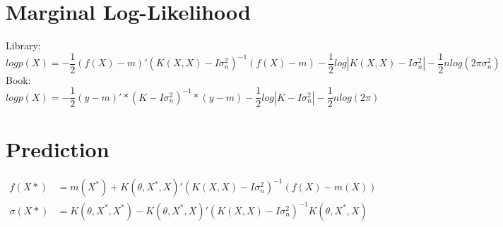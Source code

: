 \documentclass[11pt]{article}
\begin{document}
\title{}
\author{}
\date{}
\maketitle

\section{Marginal Log-Likelihood}
Library:
\begin{equation}
	log p(X) = - \frac{1}{2}(f(X)-m)'(K(X,X)-I\sigma_n^2)^{-1} (f(X)-m) - \frac{1}{2} log|K(X,X)-I\sigma_n^2 | - \frac{1}{2}n log(2 \pi \sigma_n^2)
\end{equation}
Book:
\begin{equation}
	log p(X) = - \frac{1}{2}(y-m)'* (K-I\sigma_n^2)^{-1} * (y-m) - \frac{1}{2} log|K-I\sigma_n^2 | - \frac{1}{2} nlog(2 \pi)
\end{equation}

\section{Prediction}
\begin{align}
	f(X*) &= m(X^*) + K(\theta,X^*,X)' (K(X,X)-I\sigma_n^2)^{-1} (f(X)-m(X))\\
	\sigma(X*) &= K(\theta,X^*,X^*) - K(\theta,X^*,X)' (K(X,X)-I\sigma_n^2)^{-1} K(\theta,X^*,X)
\end{align}
\end{document}
